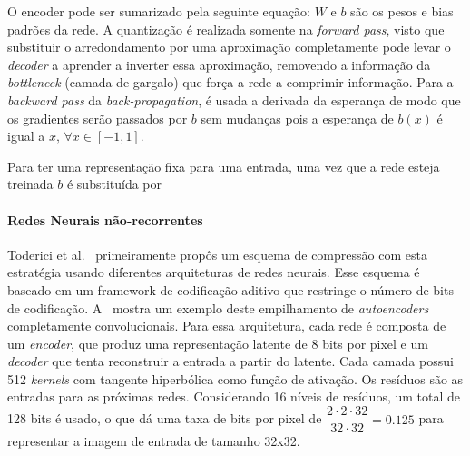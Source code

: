 O encoder pode ser sumarizado pela seguinte equação: $W$ e $b$ são os pesos e bias padrões da rede. A quantização é realizada somente na \textit{forward pass}, visto que substituir o arredondamento por uma aproximação completamente pode levar o \textit{decoder} a aprender a inverter essa aproximação, removendo a informação da \textit{bottleneck} (camada de gargalo) que força a rede a comprimir informação. Para a \textit{backward pass} da \textit{back-propagation}, é usada a derivada da esperança de modo que os gradientes serão passados por $b$ sem mudanças pois a esperança de $b(x)$ é igual a $x, \, \forall x \in [-1, 1]$. 

Para ter uma representação fixa para uma entrada, uma vez que a rede esteja treinada $b$ é substituída por 
\paragraph{Redes Neurais não-recorrentes\\}

Toderici et al.~\cite{toderici2016} primeiramente propôs um esquema de compressão com esta estratégia usando diferentes arquiteturas de redes neurais. Esse esquema é baseado em um framework de codificação aditivo que restringe o número de bits de codificação. A~ mostra um exemplo deste empilhamento de \textit{autoencoders} completamente convolucionais. Para essa arquitetura, cada rede é composta de um \textit{encoder}, que produz uma representação latente de 8 bits por pixel e um \textit{decoder} que tenta reconstruir a entrada a partir do latente. Cada camada possui 512 \textit{kernels} com tangente hiperbólica como função de ativação. Os resíduos são as entradas para as próximas redes. Considerando 16 níveis de resíduos, um total de 128 bits é usado, o que dá uma taxa de bits por pixel de $\dfrac{2 \cdot 2 \cdot 32}{32 \cdot 32} = 0.125$ para representar a imagem de entrada de tamanho 32x32. 



